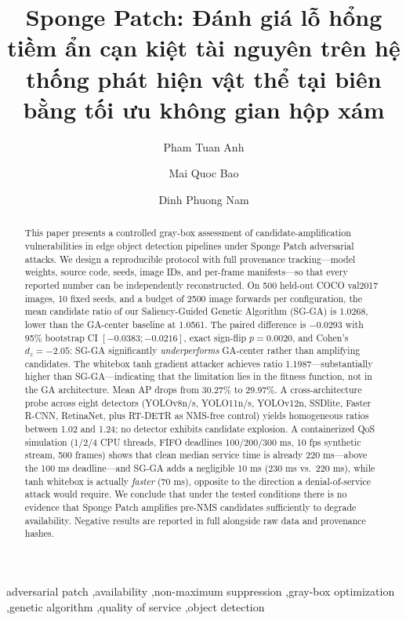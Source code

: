 \documentclass[a4paper,fleqn]{cas-dc}
\begin{document}
\let\WriteBookmarks\relax
\def\floatpagepagefraction{1}
\def\textpagefraction{.001}
\title[mode=title]{Sponge Patch: Đánh giá lỗ hổng tiềm ẩn cạn kiệt tài nguyên trên hệ thống phát hiện vật thể tại biên bằng tối ưu không gian hộp xám}
\author[1]{Pham Tuan Anh}
\author[1]{Mai Quoc Bao}
\author[1]{Dinh Phuong Nam}\cormark[1]
\begin{abstract}
This paper presents a controlled gray-box assessment of candidate-amplification vulnerabilities in edge object detection pipelines under Sponge Patch adversarial attacks. We design a reproducible protocol with full provenance tracking---model weights, source code, seeds, image IDs, and per-frame manifests---so that every reported number can be independently reconstructed. On 500 held-out COCO val2017 images, 10 fixed seeds, and a budget of 2500 image forwards per configuration, the mean candidate ratio of our Saliency-Guided Genetic Algorithm (SG-GA) is 1.0268, lower than the GA-center baseline at 1.0561. The paired difference is $-0.0293$ with 95\% bootstrap CI $[-0.0383;-0.0216]$, exact sign-flip $p = 0.0020$, and Cohen's $d_z = -2.05$: SG-GA significantly \emph{underperforms} GA-center rather than amplifying candidates. The whitebox tanh gradient attacker achieves ratio 1.1987---substantially higher than SG-GA---indicating that the limitation lies in the fitness function, not in the GA architecture. Mean AP drops from 30.27\% to 29.97\%. A cross-architecture probe across eight detectors (YOLOv8n/s, YOLO11n/s, YOLOv12n, SSDlite, Faster R-CNN, RetinaNet, plus RT-DETR as NMS-free control) yields homogeneous ratios between 1.02 and 1.24; no detector exhibits candidate explosion. A containerized QoS simulation (1/2/4 CPU threads, FIFO deadlines 100/200/300 ms, 10 fps synthetic stream, 500 frames) shows that clean median service time is already 220 ms---above the 100 ms deadline---and SG-GA adds a negligible 10 ms (230 ms vs.\ 220 ms), while tanh whitebox is actually \emph{faster} (70 ms), opposite to the direction a denial-of-service attack would require. We conclude that under the tested conditions there is no evidence that Sponge Patch amplifies pre-NMS candidates sufficiently to degrade availability. Negative results are reported in full alongside raw data and provenance hashes.
\end{abstract}
\begin{keywords}
adversarial patch \sep availability \sep non-maximum suppression \sep gray-box optimization \sep genetic algorithm \sep quality of service \sep object detection
\end{keywords}
\maketitle
\end{document}
